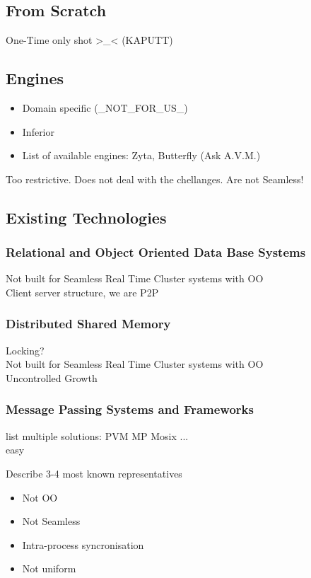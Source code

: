 \subsection{From Scratch}

One-Time only shot >\_< (KAPUTT)

\subsection{\MMORG Engines}

\begin{itemize}
        \item Domain specific (\_NOT\_FOR\_US\_)
        \item Inferior
        \item List of available engines: Zyta, Butterfly (Ask A.V.M.)
\end{itemize}

Too restrictive. Does not deal with the chellanges. Are not Seamless!

\subsection{Existing Technologies}

\subsubsection{Relational and Object Oriented Data Base Systems}

Not built for Seamless Real Time Cluster systems with OO\\
Client server structure, we are P2P

\subsubsection{Distributed Shared Memory}

Locking?\\
Not built for Seamless Real Time Cluster systems with OO\\
Uncontrolled Growth

\subsubsection{Message Passing Systems and Frameworks}

list multiple solutions: PVM MP Mosix ...\\
easy

Describe 3-4 most known representatives
\begin{itemize}
        \item Not OO
        \item Not Seamless
        \item Intra-process syncronisation
        \item Not uniform
\end{itemize}

